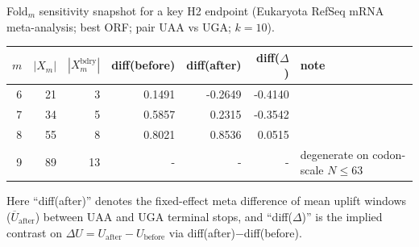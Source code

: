 Fold$_m$ sensitivity snapshot for a key H2 endpoint (Eukaryota RefSeq mRNA meta-analysis; best ORF; pair UAA vs UGA; $k=10$).

\begin{center}
\small
\setlength{\tabcolsep}{6pt}
\renewcommand{\arraystretch}{1.15}
\begin{tabular}{r r r r r r l}
\toprule
$m$ & $|X_m|$ & $|X_m^{\mathrm{bdry}}|$ & diff(before) & diff(after) & diff($\Delta$) & note \\
\midrule
6 & 21 & 3 & 0.1491 & -0.2649 & -0.4140 &  \\
7 & 34 & 5 & 0.5857 & 0.2315 & -0.3542 &  \\
8 & 55 & 8 & 0.8021 & 0.8536 & 0.0515 &  \\
9 & 89 & 13 & - & - & - & degenerate on codon-scale $N\le 63$ \\
\bottomrule
\end{tabular}
\end{center}

\noindent Here ``diff(after)'' denotes the fixed-effect meta difference of mean uplift windows ($\overline{U}_{\mathrm{after}}$) between UAA and UGA terminal stops, and ``diff($\Delta$)'' is the implied contrast on $\Delta U=U_{\mathrm{after}}-U_{\mathrm{before}}$ via diff(after)$-$diff(before).

